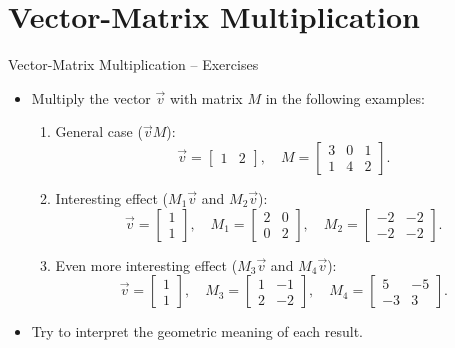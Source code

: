 \documentclass{beamer}
\begin{document}
\section{Vector-Matrix Multiplication}
\begin{frame}{Vector-Matrix Multiplication – Exercises}
  \begin{itemize}
    \item Multiply the vector $\vec{v}$ with matrix $M$ in the following examples:
    \begin{enumerate}
      \item General case (\(\vec{v}M\)):
      \begin{equation}
      \vec{v} = \begin{bmatrix} 1 & 2 \end{bmatrix},\quad
      M = \begin{bmatrix} 3 & 0 & 1 \\ 1 & 4 & 2 \end{bmatrix}.
      \end{equation}
      \item Interesting effect (\(M_1\vec{v}\) and \(M_2\vec{v}\)):
      \begin{equation}
      \vec{v} = \begin{bmatrix} 1 \\ 1 \end{bmatrix},\quad
      M_1 = \begin{bmatrix} 2 & 0 \\ 0 & 2 \end{bmatrix}, \quad
      M_2 = \begin{bmatrix} -2 & -2 \\ -2 & -2 \end{bmatrix}.
      \end{equation}
      \item Even more interesting effect (\(M_3\vec{v}\) and \(M_4\vec{v}\)):
      \begin{equation}
      \vec{v} = \begin{bmatrix} 1 \\ 1 \end{bmatrix},\quad
      M_3 = \begin{bmatrix} 1 & -1 \\ 2 & -2 \end{bmatrix}, \quad
      M_4 = \begin{bmatrix} 5 & -5 \\ -3 & 3 \end{bmatrix}.
      \end{equation}
    \end{enumerate}
    \item Try to interpret the geometric meaning of each result.
  \end{itemize}
\end{frame}
\end{document}
